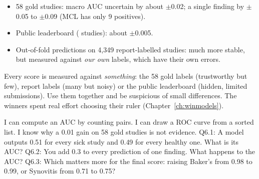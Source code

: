 \begin{innumbers}
\begin{itemize}
\item 58 gold studies: macro AUC uncertain by about $\pm$0.02; a single finding by $\pm$0.05 to $\pm$0.09 (MCL has only
      9 positives).
\item Public leaderboard ( studies): about $\pm$0.005.
\item Out-of-fold predictions on 4,349 report-labelled studies: much more stable, but measured against
      \emph{our own} labels, which have their own errors.
\end{itemize}
\end{innumbers}

\begin{keyidea}
Every score is measured against \emph{something}: the 58 gold labels (trustworthy but few), report labels (many
but noisy) or the public leaderboard (hidden, limited submissions). Use them together and be suspicious of small
differences. The winners spent real effort choosing their ruler (Chapter~\ref{ch:winmodels}).
\end{keyidea}

\begin{checkpoint}
\begin{itemize}
\done I can compute an AUC by counting pairs.
\done I can draw a ROC curve from a sorted list.
\done I know why a 0.01 gain on 58 gold studies is not evidence.
\quiz Q6.1: A model outputs 0.51 for every sick study and 0.49 for every healthy one. What is its AUC?
\quiz Q6.2: You add 0.3 to every prediction of one finding. What happens to the AUC?
\quiz Q6.3: Which matters more for the final score: raising Baker's from 0.98 to 0.99, or Synovitis from 0.71 to
      0.75?
\end{itemize}
\end{checkpoint}
